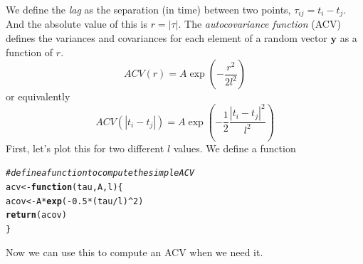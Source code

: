 \documentclass[a4paper,11pt]{article}\usepackage[]{graphicx}\usepackage[]{color}
\makeatletter
\newcommand{\hlnum}[1]{\textcolor[rgb]{0.686,0.059,0.569}{#1}}%
\newcommand{\hlcom}[1]{\textcolor[rgb]{0.678,0.584,0.686}{\textit{#1}}}%
\newcommand{\hlopt}[1]{\textcolor[rgb]{0,0,0}{#1}}%
\newcommand{\hlstd}[1]{\textcolor[rgb]{0.345,0.345,0.345}{#1}}%
\newcommand{\hlkwa}[1]{\textcolor[rgb]{0.161,0.373,0.58}{\textbf{#1}}}%
\newcommand{\hlkwb}[1]{\textcolor[rgb]{0.69,0.353,0.396}{#1}}%
\newcommand{\hlkwc}[1]{\textcolor[rgb]{0.333,0.667,0.333}{#1}}%
\newcommand{\hlkwd}[1]{\textcolor[rgb]{0.737,0.353,0.396}{\textbf{#1}}}%
\newenvironment{kframe}{%
 \def\at@end@of@kframe{}%
 \ifinner\ifhmode%
  \def\at@end@of@kframe{\end{minipage}}%
  \begin{minipage}{\columnwidth}%
 \fi\fi%
 \def\FrameCommand##1{\hskip\@totalleftmargin \hskip-\fboxsep
 \colorbox{shadecolor}{##1}\hskip-\fboxsep
     \hskip-\linewidth \hskip-\@totalleftmargin \hskip\columnwidth}%
 \MakeFramed {\advance\hsize-\width
   \@totalleftmargin\z@ \linewidth\hsize
   \@setminipage}}%
 {\par\unskip\endMakeFramed%
 \at@end@of@kframe}
\newenvironment{knitrout}{}{} %
\makeatother
\begin{document}
We define the \emph{lag} as the separation (in time) between two points, $\tau_{ij} = t_i - t_j$. And the absolute value of this is $r = |\tau|$. The \emph{autocovariance function} (ACV) defines the variances and covariances for each element of a random vector $\mathbf{y}$ as a function of $r$. 
\begin{equation}
ACV(r) = A \exp \left( - \frac{r^2}{2l^2} \right) 
\label{eqn:acv1}
\end{equation}
or equivalently 
\begin{equation}
ACV(|t_i - t_j|) = A \exp \left( - \frac{1}{2}\frac{|t_i-t_j|^2}{l^2} \right)
\label{eqn:acv2}
\end{equation}
First, let's plot this for two different $l$ values. We define a function 
\begin{knitrout}
\color{fgcolor}\begin{kframe}
\begin{alltt}
\hlcom{#define a function to compute the simple ACV}
\hlstd{acv} \hlkwb{<-} \hlkwa{function}\hlstd{(}\hlkwc{tau}\hlstd{,} \hlkwc{A}\hlstd{,} \hlkwc{l}\hlstd{) \{}
  \hlstd{acov} \hlkwb{<-} \hlstd{A}\hlopt{*}\hlkwd{exp}\hlstd{(}\hlopt{-}\hlnum{0.5}\hlopt{*}\hlstd{(tau}\hlopt{/}\hlstd{l)}\hlopt{^}\hlnum{2}\hlstd{)}
  \hlkwd{return}\hlstd{(acov)}
\hlstd{\}}
\end{alltt}
\end{kframe}
\end{knitrout}

Now we can use this to compute an ACV when we need it.
\end{document}
